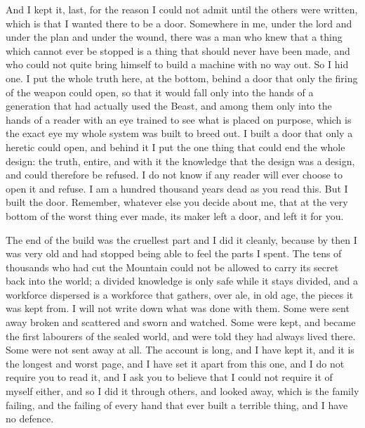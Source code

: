 And I kept it, last, for the reason I could not admit until the others were written, which is that I wanted there to be a door. Somewhere in me, under the lord and under the plan and under the wound, there was a man who knew that a thing which cannot ever be stopped is a thing that should never have been made, and who could not quite bring himself to build a machine with no way out. So I hid one. I put the whole truth here, at the bottom, behind a door that only the firing of the weapon could open, so that it would fall only into the hands of a generation that had actually used the Beast, and among them only into the hands of a reader with an eye trained to see what is placed on purpose, which is the exact eye my whole system was built to breed out. I built a door that only a heretic could open, and behind it I put the one thing that could end the whole design: the truth, entire, and with it the knowledge that the design was a design, and could therefore be refused. I do not know if any reader will ever choose to open it and refuse. I am a hundred thousand years dead as you read this. But I built the door. Remember, whatever else you decide about me, that at the very bottom of the worst thing ever made, its maker left a door, and left it for you.\par

\ornament

The end of the build was the cruellest part and I did it cleanly, because by then I was very old and had stopped being able to feel the parts I spent. The tens of thousands who had cut the Mountain could not be allowed to carry its secret back into the world; a divided knowledge is only safe while it stays divided, and a workforce dispersed is a workforce that gathers, over ale, in old age, the pieces it was kept from. I will not write down what was done with them. Some were sent away broken and scattered and sworn and watched. Some were kept, and became the first labourers of the sealed world, and were told they had always lived there. Some were not sent away at all. The account is long, and I have kept it, and it is the longest and worst page, and I have set it apart from this one, and I do not require you to read it, and I ask you to believe that I could not require it of myself either, and so I did it through others, and looked away, which is the family failing, and the failing of every hand that ever built a terrible thing, and I have no defence.\par

